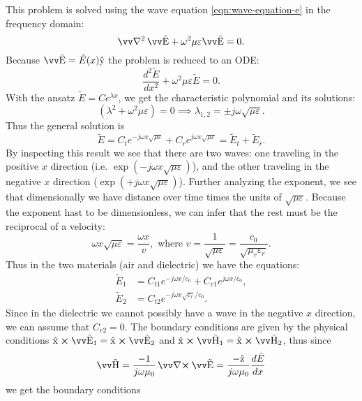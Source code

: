 \documentclass[margin=small]{tex/hsrzf}
\theoremstyle{elmagzf}
\begin{document}
This problem is solved using the wave equation \eqref{eqn:wave-equation-e} in the
frequency domain:
\[
  \vlaplacian \vwave{E} + \omega^2 \mu \varepsilon \vwave{E} = 0.
\]
Because \(\vwave{E} = \tilde{E}(x) \uvec{y}\) the problem is reduced to an ODE:
\begin{equation}
  \frac{d^2 \tilde{E}}{dx^2} + \omega^2 \mu \varepsilon \tilde{E} = 0.
\end{equation}
With the ansatz \(\tilde{E} = Ce^{\lambda x}\), we get the characteristic
polynomial and its solutions:
\[
  (\lambda^2 + \omega^2\mu\varepsilon) = 0
    \implies \lambda_{1,2} = \pm j\omega\sqrt{\mu\varepsilon}.
\]
Thus the general solution is
\[
  \tilde{E} = C_t e^{-j\omega x\sqrt{\mu\varepsilon}}
    + C_r e^{j\omega x\sqrt{\mu\varepsilon}}
    = \tilde{E}_t + \tilde{E}_r.
\]
By inspecting this result we see that there are two waves: one traveling in the
positive \(x\) direction (i.e. \(\exp(-j\omega x\sqrt{\mu\varepsilon})\)), and
the other traveling in the negative \(x\) direction (\(\exp(+j\omega
x\sqrt{\mu\varepsilon})\)). Further analyzing the exponent, we see that
dimensionally we have distance over time times the units of
\(\sqrt{\mu\varepsilon}\). Because the exponent hast to be dimensionless, we can
infer that the rest must be the reciprocal of a velocity:
\[
  \omega x \sqrt{\mu\varepsilon} = \frac{\omega x}{v}, 
  \text{ where } v = \frac{1}{\sqrt{\mu\varepsilon}}
  = \frac{c_0}{\sqrt{\mu_r\varepsilon_r}}.
\]
Thus in the two materials (air and dielectric) we have the equations:
\begin{subequations}
  \begin{align}
    \tilde{E}_1 &= C_{t1} e^{-j\omega x / c_0} + C_{r1} e^{j\omega x / c_0}, \\
    \tilde{E}_2 &= C_{t2} e^{-j\omega x \sqrt{\varepsilon_r} / c_0}.
  \end{align}
\end{subequations}
Since in the dielectric we cannot possibly have a wave in the negative \(x\)
direction, we can assume that \(C_{r2} = 0\).  The boundary conditions are given
by the physical conditions \(\uvec{x} \crossp \vwave{E}_1 = \uvec{x} \crossp
\vwave{E}_2\) and \(\uvec{x} \crossp \vwave{H}_1 = \uvec{x} \crossp
\vwave{H}_2\), thus since
\[
  \vwave{H} = \frac{-1}{j\omega \mu_0} \curl \vwave{E}
  = \frac{- \uvec{z}}{j\omega \mu_0} \frac{d\tilde{E}}{dx}
\]
we get the boundary conditions
\begin{subequations}
\end{subequations}
\end{document}
